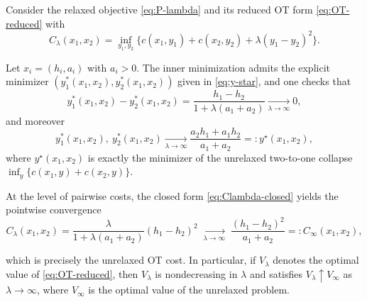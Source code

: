 \documentclass[11pt]{article}
\begin{document}

\begin{remark}\label{rem:lambda_to_infty}
  Consider the relaxed objective \eqref{eq:P-lambda} and its reduced OT form \eqref{eq:OT-reduced} with
  \begin{equation*}
      C_\lambda(x_1,x_2)=\inf_{y_1,y_2}\Big\{c(x_1,y_1)+c(x_2,y_2)+\lambda(y_1-y_2)^2\Big\}.
    \end{equation*}

  Let $x_i=(h_i,a_i)$ with $a_i>0$. The inner minimization admits the explicit minimizer
  $(y_1^*(x_1,x_2),y_2^*(x_1,x_2))$ given in \eqref{eq:y-star}, and one checks that
  \begin{equation}\label{eq:collapse_y1y2}
  y_1^*(x_1,x_2)-y_2^*(x_1,x_2)=\frac{h_1-h_2}{1+\lambda(a_1+a_2)}\xrightarrow[\lambda\to\infty]{}0,
  \end{equation}
  and moreover
  \begin{equation}\label{eq:collapse_to_bary}
  y_1^*(x_1,x_2),\ y_2^*(x_1,x_2)
  \xrightarrow[\lambda\to\infty]{}
  \frac{a_2h_1+a_1h_2}{a_1+a_2}
  =:y^\star(x_1,x_2),
  \end{equation}
  where $y^\star(x_1,x_2)$ is exactly the minimizer of the unrelaxed two-to-one collapse
  $\inf_{y}\{c(x_1,y)+c(x_2,y)\}$.
  
  At the level of pairwise costs, the closed form \eqref{eq:Clambda-closed} yields the pointwise convergence
  \begin{equation*}
  C_\lambda(x_1,x_2)=\frac{\lambda}{1+\lambda(a_1+a_2)}(h_1-h_2)^2
  \;\xrightarrow[\lambda\to\infty]{}\;
  \frac{(h_1-h_2)^2}{a_1+a_2}
  =:C_\infty(x_1,x_2),
\end{equation*}

  which is precisely the unrelaxed OT cost. In particular, if $V_\lambda$ denotes the optimal value of
  \eqref{eq:OT-reduced}, then $V_\lambda$ is nondecreasing in $\lambda$ and satisfies
  $V_\lambda\uparrow V_\infty$ as $\lambda\to\infty$, where $V_\infty$ is the optimal value of the
  unrelaxed problem.
  

\end{remark}
\end{document}
